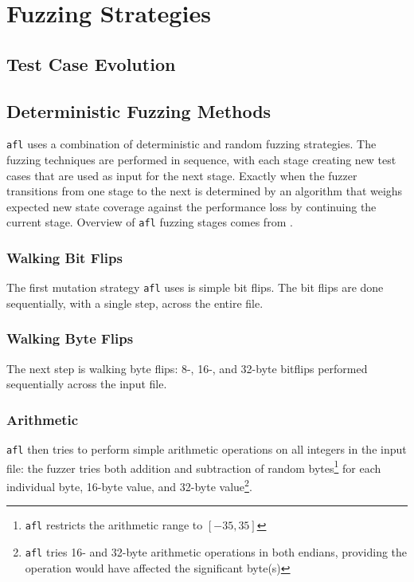 
\section{Fuzzing Strategies}


\subsection{Test Case Evolution}


\subsection{Deterministic Fuzzing Methods}

\texttt{afl} uses a combination of deterministic and random fuzzing strategies.
The fuzzing techniques are performed in sequence, with each stage
creating new test cases that are used as input for the next stage. Exactly
when the fuzzer transitions from one stage to the next is determined by an
algorithm that weighs expected new state coverage against the performance
loss by continuing the current stage. Overview of \texttt{afl} fuzzing
stages comes from \cite{afl-fuzzing-blogpost}.

\subsubsection{Walking Bit Flips}

The first mutation strategy \texttt{afl} uses is simple bit flips. The bit
flips are done sequentially, with a single step, across the entire file.

\subsubsection{Walking Byte Flips}

The next step is walking byte flips: 8-, 16-, and 32-byte bitflips performed
sequentially across the input file.

\subsubsection{Arithmetic}

\texttt{afl} then tries to perform simple arithmetic operations
on all integers in the input file: the fuzzer tries both addition and
subtraction of random bytes\footnote{\texttt{afl} restricts the arithmetic range to $[-35, 35]$\cite{afl-whitepaper}} for each
individual byte, 16-byte value, and 32-byte value\footnote{\texttt{afl} tries 16- and 32-byte arithmetic operations in both endians, providing the operation would have affected the significant byte(s)\cite{afl-whitepaper}}.

